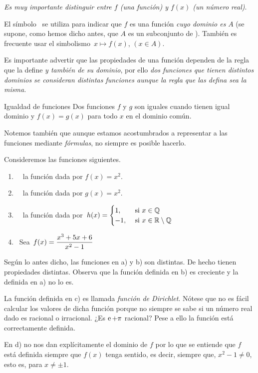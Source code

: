 \emph{Es muy importante distinguir entre $f$ (una función) y $f(x)$
(un número real)}.

El símbolo \ se utiliza para indicar que $f$
es una función \emph{cuyo dominio es} $A$ (se supone, como hemos
dicho antes, que $A$ es un subconjunto de \R). También es frecuente
usar el simbolismo $\,x\mapsto f(x)$, $(x\in A)$.

Es importante advertir\marginpar{\flushright\curvasr} que las propiedades
de una función dependen de la regla que la define \emph{y también
de su dominio}, por ello \emph{dos funciones que tienen distintos
dominios se consideran distintas funciones aunque la regla que las
defina sea la misma.} 

\begin{defi}{Igualdad de funciones}{} Dos funciones $f$ y $g$ son
iguales cuando tienen igual dominio y $f(x)=g(x)$ para todo $x$
en el dominio común. \end{defi}

Notemos también que aunque estamos acostumbrados a representar a las
funciones mediante \emph{fórmulas}, no siempre es posible hacerlo.
\begin{ejemplo} Consideremos las funciones siguientes. \begin{enumerate}

\item \ \ la función dada por $f(x)=x^{2}$. 

\item \ \ la función dada por $g(x)=x^{2}$. 

\item \ \ la función dada por\ $h(x)=\begin{cases}
1,\  & \text{si \ensuremath{x\in\mathbb Q}}\\
-1,\  & \text{si \ensuremath{x\in\mathbb R\setminus\mathbb Q}}
\end{cases}$ 

\item \ Sea $\,f(x)=\displaystyle\frac{x^{3}+5x+6}{x^{2}-1}$

\end{enumerate} Según lo antes dicho, las funciones en a) y b) son
distintas. De hecho tienen propiedades distintas. Observa que la función
definida en b) es creciente y la definida en a) no lo es.\par La
función definida en c) es llamada \emph{función de Dirichlet}. Nótese
que no es fácil calcular los valores de dicha función porque no siempre
se sabe si un número real dado es racional o irracional. ¿Es $\operatorname{e}+\pi$
racional? Pese a ello la función está correctamente definida.\par En
d) no nos dan explícitamente el dominio de $f$ por lo que se entiende
que $f$ está definida siempre que $f(x)$ tenga sentido, es decir,
siempre que, $x^{2}-1\neq0$, esto es, para $x\neq\pm1$. \end{ejemplo}

